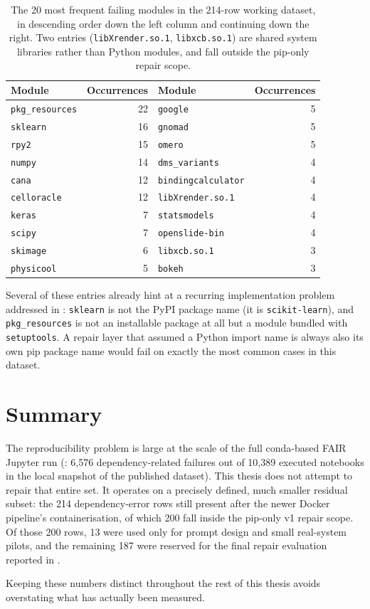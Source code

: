 \begin{table}[htbp]
  \centering
  \begin{tabular}{|l|r||l|r|}
    \hline
    \textbf{Module} & \textbf{Occurrences} & \textbf{Module} & \textbf{Occurrences} \\
    \hline
    \texttt{pkg\_resources} & 22 & \texttt{google} & 5 \\
    \hline
    \texttt{sklearn} & 16 & \texttt{gnomad} & 5 \\
    \hline
    \texttt{rpy2} & 15 & \texttt{omero} & 5 \\
    \hline
    \texttt{numpy} & 14 & \texttt{dms\_variants} & 4 \\
    \hline
    \texttt{cana} & 12 & \texttt{bindingcalculator} & 4 \\
    \hline
    \texttt{celloracle} & 12 & \texttt{libXrender.so.1} & 4 \\
    \hline
    \texttt{keras} & 7 & \texttt{statsmodels} & 4 \\
    \hline
    \texttt{scipy} & 7 & \texttt{openslide-bin} & 4 \\
    \hline
    \texttt{skimage} & 6 & \texttt{libxcb.so.1} & 3 \\
    \hline
    \texttt{physicool} & 5 & \texttt{bokeh} & 3 \\
    \hline
  \end{tabular}
  \caption{The 20 most frequent failing modules in the 214-row working
  dataset, in descending order down the left column and continuing down the
  right. Two entries (\texttt{libXrender.so.1}, \texttt{libxcb.so.1}) are
  shared system libraries rather than Python modules, and fall outside the
  pip-only repair scope.}
  \label{tab:pd-top-modules}
\end{table}

Several of these entries already hint at a recurring implementation problem
addressed in : \texttt{sklearn} is not the PyPI
package name (it is \texttt{scikit-learn}), and \texttt{pkg\_resources} is
not an installable package at all but a module bundled with
\texttt{setuptools}. A repair layer that assumed a Python import name is
always also its own pip package name would fail on exactly the most common
cases in this dataset.

\section{Summary}
\label{sec:pd-summary}

The reproducibility problem is large at the scale of the full conda-based
FAIR Jupyter run (: 6,576 dependency-related failures out of
10,389 executed notebooks in the local snapshot of the published
dataset). This thesis does not attempt to repair that
entire set. It operates on a precisely defined, much smaller residual
subset: the 214 dependency-error rows still present after the newer Docker
pipeline's containerisation, of which 200 fall inside the pip-only v1 repair
scope. Of those 200 rows, 13 were used only for prompt design and small
real-system pilots, and the remaining 187 were reserved for the final
repair evaluation reported in .

Keeping these numbers
distinct throughout the rest of this thesis avoids overstating what has
actually been measured.
